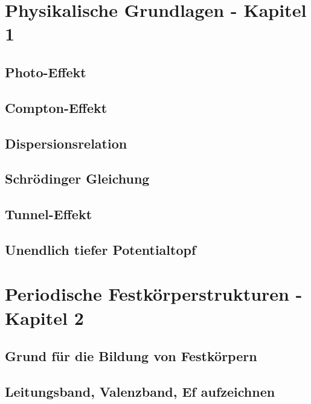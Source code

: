 \documentclass{article}
\begin{document}
\section{Physikalische Grundlagen - Kapitel 1}
\subsection{Photo-Effekt}\label{k1:photoEf}
\subsection{Compton-Effekt}\label{k1:comptonEf}
\subsection{Dispersionsrelation}\label{kX:dispersionsrelation}



\subsection{Schrödinger Gleichung}\label{k1:schrGl}


\subsection{Tunnel-Effekt}\label{k1:tunnEf}
\subsection{Unendlich tiefer Potentialtopf}\label{k1:potentialtopf}


\section{Periodische Festkörperstrukturen - Kapitel 2}
\subsection{Grund für die Bildung von Festkörpern}\label{k2:festkorper}
\subsection{Leitungsband, Valenzband, Ef aufzeichnen}\label{kX:leitungsBand}
\end{document}
